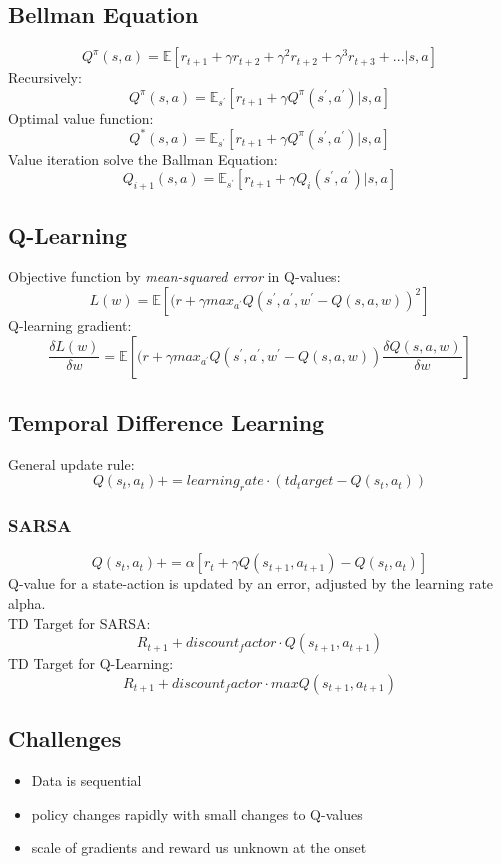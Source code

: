 \subsection{Bellman Equation}
\label{ssect:bellman-equation}
\[
Q^{\pi}(s, a) = \mathbb{E}[r_{t + 1} + \gamma r_{t + 2} + \gamma^2 r_{t + 2} + \gamma^3 r_{t + 3} + ... | s, a]
\]
Recursively:
\[
Q^{\pi}(s, a) = \mathbb{E}_{s^{'}}[r_{t + 1} + \gamma Q^{\pi}(s^{'}, a^{'})| s, a]
\]
Optimal value function:
\[
Q^{*}(s, a) = \mathbb{E}_{s^{'}}[r_{t + 1} + \gamma Q^{\pi}(s^{'}, a^{'})| s, a]
\]
Value iteration solve the Ballman Equation:
\[
Q_{i + 1}(s, a) = \mathbb{E}_{s^{'}}[r_{t + 1} + \gamma Q_i(s^{'}, a^{'})| s, a]
\]
\subsection{Q-Learning}
\label{ssect:q-learning}
Objective function by \textit{mean-squared error} in Q-values:
\[
L(w) = \mathbb{E}[(r + \gamma max_{a^{'}}Q(s^{'}, a^{'}, w^{'} - Q(s, a, w))^2]
\]
Q-learning gradient:
\[
\frac{\delta L(w)}{\delta w} = \mathbb{E}[(r + \gamma max_{a^{'}}Q(s^{'}, a^{'}, w^{'} - Q(s, a, w)) \frac{\delta Q(s, a, w)}{\delta w}]
\]

\subsection{Temporal Difference Learning}
\label{ssect:temporal-difference-learning}
General update rule:
\[
Q(s_t, a_t) += learning_rate \cdot (td_target - Q(s_t, a_t))
\]
\subsubsection{SARSA}
\label{sssect:sarsa}
\[
Q(s_t, a_t) += \alpha [r_t + \gamma Q(s_{t+1}, a_{t+1}) - Q(s_t, a_t)]
\]
Q-value for a state-action is updated by an error, adjusted by the learning rate alpha.\\
TD Target for SARSA:
\[
R_{t + 1} + discount_factor \cdot Q(s_{t + 1}, a_{t + 1})
\]
TD Target for Q-Learning:
\[
R_{t + 1} + discount_factor \cdot maxQ(s_{t + 1}, a_{t + 1})
\]

\subsection{Challenges}
\label{ssect:challenges}
\begin{itemize}
	\item Data is sequential
	\item policy changes rapidly with small changes to Q-values
	\item scale of gradients and reward us unknown at the onset
\end{itemize}
\newpage